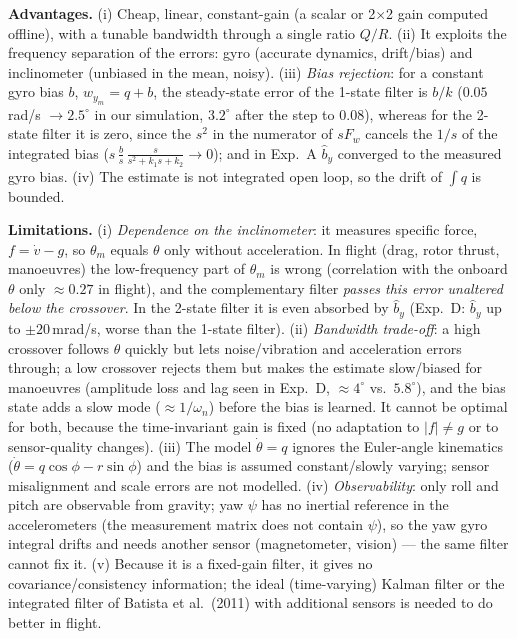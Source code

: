 \textbf{Advantages.}
(i) Cheap, linear, constant-gain (a scalar or 2$\times$2 gain computed offline), with a tunable bandwidth through a single ratio $Q/R$.
(ii) It exploits the frequency separation of the errors: gyro (accurate dynamics, drift/bias) and inclinometer (unbiased in the mean, noisy).
(iii) \emph{Bias rejection}: for a constant gyro bias $b$, $w_{y_m}=q+b$, the steady-state error of the 1-state filter is $b/k$
($0.05$\,rad/s $\to2.5^\circ$ in our simulation, $3.2^\circ$ after the step to $0.08$), whereas for the 2-state filter it is zero, since the $s^2$ in the numerator of $sF_w$ cancels the
$1/s$ of the integrated bias ($s\,\tfrac{b}{s}\,\tfrac{s}{s^2+k_1s+k_2}\to0$); and in Exp.~A $\hat b_y$ converged to the measured gyro bias.
(iv) The estimate is not integrated open loop, so the drift of $\int q$ is bounded.

\textbf{Limitations.}
(i) \emph{Dependence on the inclinometer}: it measures specific force, $f=\dot v-g$, so $\theta_m$ equals $\theta$ only without acceleration. In flight (drag, rotor thrust, manoeuvres)
the low-frequency part of $\theta_m$ is wrong (correlation with the onboard $\theta$ only $\approx0.27$ in flight), and the complementary filter \emph{passes this error unaltered below the crossover}.
In the 2-state filter it is even absorbed by $\hat b_y$ (Exp.~D: $\hat b_y$ up to $\pm20$\,mrad/s, worse than the 1-state filter).
(ii) \emph{Bandwidth trade-off}: a high crossover follows $\theta$ quickly but lets noise/vibration and acceleration errors through; a low crossover rejects them but makes the estimate
slow/biased for manoeuvres (amplitude loss and lag seen in Exp.~D, $\approx4^\circ$ vs.\ $5.8^\circ$), and the bias state adds a slow mode ($\approx1/\omega_n$) before the bias is learned.
It cannot be optimal for both, because the time-invariant gain is fixed (no adaptation to $|f|\neq g$ or to sensor-quality changes).
(iii) The model $\dot\theta=q$ ignores the Euler-angle kinematics ($\dot\theta=q\cos\phi-r\sin\phi$) and the bias is assumed constant/slowly varying; sensor misalignment and scale errors are not modelled.
(iv) \emph{Observability}: only roll and pitch are observable from gravity; yaw $\psi$ has no inertial reference in the accelerometers (the measurement matrix does not contain $\psi$), so the yaw gyro integral drifts
and needs another sensor (magnetometer, vision) --- the same filter cannot fix it.
(v) Because it is a fixed-gain filter, it gives no covariance/consistency information; the ideal (time-varying) Kalman filter or the integrated filter of Batista et al.\ (2011) with additional sensors is needed
to do better in flight.
